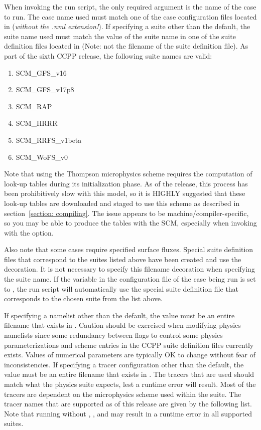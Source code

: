 When invoking the run script, the only required argument is the name of the case to run. The case name used must match one of the case configuration files located in  (\emph{without the .nml extension!}). If specifying a suite other than the default, the suite name used must match the value of the suite name in one of the suite definition files located in  (Note: not the filename of the suite definition file). As part of the sixth CCPP release, the following suite names are valid:
\begin{enumerate}
\item SCM\_GFS\_v16
\item SCM\_GFS\_v17p8
\item SCM\_RAP
\item SCM\_HRRR
\item SCM\_RRFS\_v1beta
\item SCM\_WoFS\_v0
\end{enumerate}

Note that using the Thompson microphysics scheme requires the computation of look-up tables during its initialization phase. As of the release, this process has been prohibitively slow with this model, so it is HIGHLY suggested that these look-up tables are downloaded and staged to use this scheme as described in section~\ref{section: compiling}. The issue appears to be machine/compiler-specific, so you may be able to produce the tables with the SCM, especially when invoking  with the  option.

Also note that some cases require specified surface fluxes. Special suite definition files that correspond to the suites listed above have been created and use the  decoration. It is not necessary to specify this filename decoration when specifying the suite name. If the  variable in the configuration file of the case being run is set to , the run script will automatically use the special suite definition file that corresponds to the chosen suite from the list above.

If specifying a namelist other than the default, the value must be an entire filename that exists in . Caution should be exercised when modifying physics namelists since some redundancy between flags to control some physics parameterizations and scheme entries in the CCPP suite definition files currently exists. Values of numerical parameters are typically OK to change without fear of inconsistencies. If specifying a tracer configuration other than the default, the value must be an entire filename that exists in . The tracers that are used should match what the physics suite expects, lest a runtime error will result. Most of the tracers are dependent on the microphysics scheme used within the suite. The tracer names that are supported as of this release are given by the following list. Note that running without , , and  may result in a runtime error in all supported suites. 


